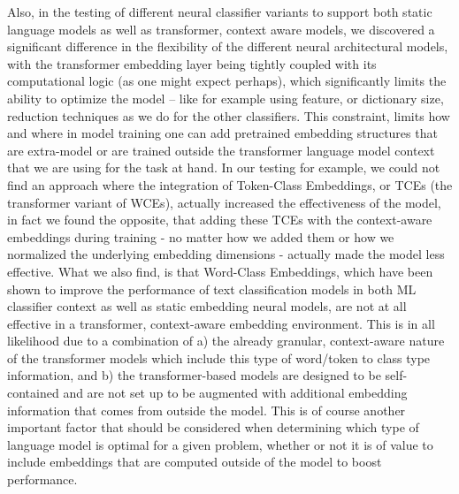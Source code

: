 \documentclass[final]{clv2025}
\begin{document}
Also, in the testing of different neural classifier variants to support both static language models as well as transformer, context aware models, we discovered a significant difference in the flexibility of the different neural architectural models, with the transformer embedding layer being tightly coupled with its computational logic (as one might expect perhaps), which significantly limits the ability to optimize the model – like for example using feature, or dictionary size, reduction techniques as we do for the other classifiers. This constraint, limits how and where in model training one can add pretrained embedding structures that are extra-model or are trained outside the transformer language model context that we are using for the task at hand.  In our testing for example, we could not find an approach where the integration of Token-Class Embeddings, or TCEs (the transformer variant of WCEs), actually increased the effectiveness of the model, in fact we found the opposite, that adding these TCEs with the context-aware embeddings during training - no matter how we added them or how we normalized the underlying embedding dimensions - actually made the model less effective. What we also find, is that Word-Class Embeddings, which have been shown to improve the performance of text classification models in both ML classifier context as well as static embedding neural models, are not at all effective in a transformer, context-aware embedding environment. This is in all likelihood due to a combination of a) the already granular, context-aware nature of the transformer models which include this type of word/token to class type information, and b) the transformer-based models are designed to be self-contained and are not set up to be augmented with additional embedding information that comes from outside the model. This is of course another important factor that should be considered when determining which type of language model is optimal for a given problem, whether or not it is of value to include embeddings that are computed outside of the model to boost performance.
\end{document}
